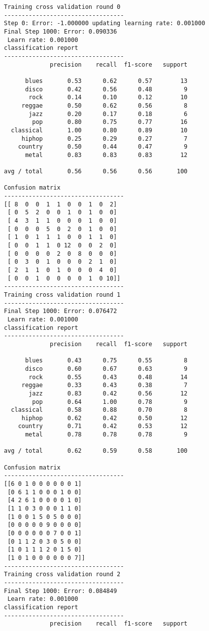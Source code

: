 \documentclass{article}
\begin{document}
    \begin{Verbatim}[commandchars=\\\{\}]
Training cross validation round 0
----------------------------------
Step 0: Error: -1.000000 updating learning rate: 0.001000
Final Step 1000: Error: 0.090336 
 Learn rate: 0.001000
classification report 
----------------------------------
             precision    recall  f1-score   support

      blues       0.53      0.62      0.57        13
      disco       0.42      0.56      0.48         9
       rock       0.14      0.10      0.12        10
     reggae       0.50      0.62      0.56         8
       jazz       0.20      0.17      0.18         6
        pop       0.80      0.75      0.77        16
  classical       1.00      0.80      0.89        10
     hiphop       0.25      0.29      0.27         7
    country       0.50      0.44      0.47         9
      metal       0.83      0.83      0.83        12

avg / total       0.56      0.56      0.56       100

Confusion matrix
----------------------------------
[[ 8  0  0  1  1  0  0  1  0  2]
 [ 0  5  2  0  0  1  0  1  0  0]
 [ 4  3  1  1  0  0  0  1  0  0]
 [ 0  0  0  5  0  2  0  1  0  0]
 [ 1  0  1  1  1  0  0  1  1  0]
 [ 0  0  1  1  0 12  0  0  2  0]
 [ 0  0  0  0  2  0  8  0  0  0]
 [ 0  3  0  1  0  0  0  2  1  0]
 [ 2  1  1  0  1  0  0  0  4  0]
 [ 0  0  1  0  0  0  0  1  0 10]]
----------------------------------
Training cross validation round 1
----------------------------------
Final Step 1000: Error: 0.076472 
 Learn rate: 0.001000
classification report 
----------------------------------
             precision    recall  f1-score   support

      blues       0.43      0.75      0.55         8
      disco       0.60      0.67      0.63         9
       rock       0.55      0.43      0.48        14
     reggae       0.33      0.43      0.38         7
       jazz       0.83      0.42      0.56        12
        pop       0.64      1.00      0.78         9
  classical       0.58      0.88      0.70         8
     hiphop       0.62      0.42      0.50        12
    country       0.71      0.42      0.53        12
      metal       0.78      0.78      0.78         9

avg / total       0.62      0.59      0.58       100

Confusion matrix
----------------------------------
[[6 0 1 0 0 0 0 0 0 1]
 [0 6 1 1 0 0 0 1 0 0]
 [4 2 6 1 0 0 0 0 1 0]
 [1 1 0 3 0 0 0 1 1 0]
 [1 0 0 1 5 0 5 0 0 0]
 [0 0 0 0 0 9 0 0 0 0]
 [0 0 0 0 0 0 7 0 0 1]
 [0 1 1 2 0 3 0 5 0 0]
 [1 0 1 1 1 2 0 1 5 0]
 [1 0 1 0 0 0 0 0 0 7]]
----------------------------------
Training cross validation round 2
----------------------------------
Final Step 1000: Error: 0.084849 
 Learn rate: 0.001000
classification report 
----------------------------------
             precision    recall  f1-score   support


\end{Verbatim}
\end{document}
